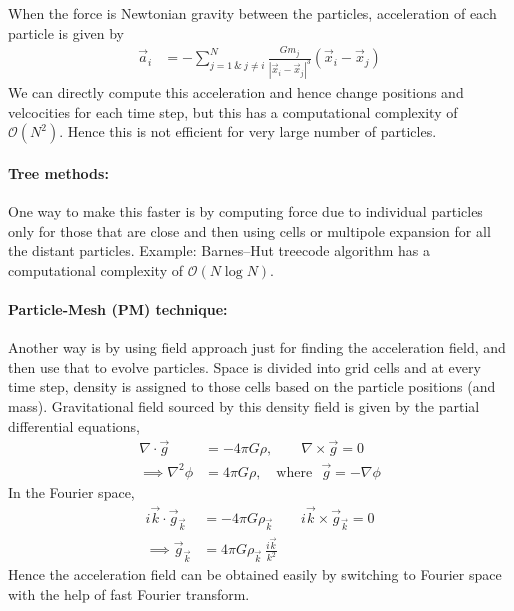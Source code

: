 \documentclass[12pt]{article}
\begin{document}
When the force is Newtonian gravity between the particles, acceleration of each particle is given by
\begin{align}
\vec{a}_i &= - \sum_{j=1 ~\&~ j\neq i}^{N} \frac{G m_j}{|\vec{x}_i-\vec{x}_j|^3} (\vec{x}_i-\vec{x}_j)
\end{align}
We can directly compute this acceleration and hence change positions and velcocities for each time step, but this has a computational complexity of $\mathcal{O}(N^2)$. Hence this is not efficient for very large number of particles.
\paragraph{Tree methods:}
One way to make this faster is by computing force due to individual particles only for those that are close and then using cells or multipole expansion for all the distant particles. Example: Barnes–Hut treecode algorithm has a computational complexity of $\mathcal{O}(N \log N)$.

\paragraph{Particle-Mesh (PM) technique:}
Another way is by using field approach just for finding the acceleration field, and then use that to evolve particles. Space is divided into grid cells and at every time step, density is assigned to those cells based on the particle positions (and mass). Gravitational field sourced by this density field is given by the partial differential equations, %
\begin{align}
\nabla \cdot \vec{g} &= - 4 \pi G \rho, \qquad \nabla \times \vec{g} = 0\\ 
\implies \nabla^2 \phi &= 4 \pi G \rho, \quad \text{where}~~~ \vec{g} = -\nabla \phi
\end{align}
In the Fourier space,
\begin{align}
i \vec{k} \cdot \vec{g}_{\vec{k}} &= - 4 \pi G \rho_{\vec{k}} \qquad i \vec{k} \times \vec{g}_{\vec{k}} = 0\\
\implies \vec{g}_{\vec{k}} &= 4 \pi G \rho_{\vec{k}} ~\frac{i \vec{k}}{k^2}
\end{align}
Hence the acceleration field can be obtained easily by switching to Fourier space with the help of fast Fourier transform. 


\end{document}
